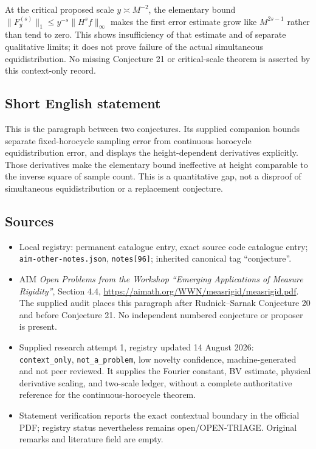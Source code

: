 \documentclass[11pt]{article}
\begin{document}
At the critical proposed scale $y\asymp M^{-2}$, the elementary bound $\|F_y^{(s)}\|_1\leq y^{-s}\|H^sf\|_\infty$ makes the first error estimate grow like $M^{2s-1}$ rather than tend to zero. This shows insufficiency of that estimate and of separate qualitative limits; it does not prove failure of the actual simultaneous equidistribution. No missing Conjecture 21 or critical-scale theorem is asserted by this context-only record.
\subsection{Short English statement}
This is the paragraph between two conjectures. Its supplied companion bounds separate fixed-horocycle sampling error from continuous horocycle equidistribution error, and displays the height-dependent derivatives explicitly. Those derivatives make the elementary bound ineffective at height comparable to the inverse square of sample count. This is a quantitative gap, not a disproof of simultaneous equidistribution or a replacement conjecture.
\subsection{Sources}
\begin{itemize}
\item Local registry: permanent catalogue entry, exact source code catalogue entry; \texttt{aim-other-notes.json}, \texttt{notes[96]}; inherited canonical tag ``conjecture''.
\item AIM \emph{Open Problems from the Workshop ``Emerging Applications of Measure Rigidity''}, Section 4.4, \url{https://aimath.org/WWN/measrigid/measrigid.pdf}. The supplied audit places this paragraph after Rudnick--Sarnak Conjecture 20 and before Conjecture 21. No independent numbered conjecture or proposer is present.
\item Supplied research attempt 1, registry updated 14 August 2026: \texttt{context\_only}, \texttt{not\_a\_problem}, low novelty confidence, machine-generated and not peer reviewed. It supplies the Fourier constant, BV estimate, physical derivative scaling, and two-scale ledger, without a complete authoritative reference for the continuous-horocycle theorem.
\item Statement verification reports the exact contextual boundary in the official PDF; registry status nevertheless remains open/OPEN-TRIAGE. Original remarks and literature field are empty.
\end{itemize}
\end{document}
